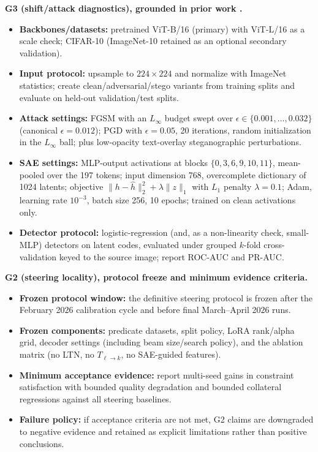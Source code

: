 \documentclass[../ppgc-tese.tex]{subfiles}
\begin{document}
\textbf{G3 (shift/attack diagnostics), grounded in prior work \cite{carvalho2026interpretable_stego_detection_sae}.}
\begin{itemize}
    \item \textbf{Backbones/datasets:} pretrained ViT-B/16 (primary) with ViT-L/16 as a scale check;
    CIFAR-10 (ImageNet-10 retained as an optional secondary validation).
    \item \textbf{Input protocol:} upsample to $224\times224$ and normalize with ImageNet statistics; create clean/adversarial/stego variants from training splits and evaluate on held-out validation/test splits.
    \item \textbf{Attack settings:} FGSM with an $L_\infty$ budget swept over $\epsilon\in\{0.001,\dots,0.032\}$ (canonical $\epsilon=0.012$); PGD with $\epsilon=0.05$, 20 iterations, random initialization in the $L_\infty$ ball; plus low-opacity text-overlay steganographic perturbations.
    \item \textbf{SAE settings:} MLP-output activations at blocks $\{0,3,6,9,10,11\}$, mean-pooled over the 197 tokens; input dimension 768, overcomplete dictionary of 1024 latents; objective $\|h-\hat h\|_2^2+\lambda\|z\|_1$ with $L_1$ penalty $\lambda=0.1$; Adam, learning rate $10^{-3}$, batch size 256, 10 epochs; trained on clean activations only.
    \item \textbf{Detector protocol:} logistic-regression (and, as a non-linearity check, small-MLP) detectors on latent codes, evaluated under grouped $k$-fold cross-validation keyed to the source image; report ROC-AUC and PR-AUC.
\end{itemize}

\textbf{G2 (steering locality), protocol freeze and minimum evidence criteria.}
\begin{itemize}
    \item \textbf{Frozen protocol window:} the definitive steering protocol is frozen after the February 2026 calibration cycle and before final March--April 2026 runs.
    \item \textbf{Frozen components:} predicate datasets, split policy, LoRA rank/alpha grid, decoder settings (including beam size/search policy), and the ablation matrix (no LTN, no $T_{\ell\to k}$, no SAE-guided features).
    \item \textbf{Minimum acceptance evidence:} report multi-seed gains in constraint satisfaction with bounded quality degradation and bounded collateral regressions against all steering baselines.
    \item \textbf{Failure policy:} if acceptance criteria are not met, G2 claims are downgraded to negative evidence and retained as explicit limitations rather than positive conclusions.
\end{itemize}
\end{document}
